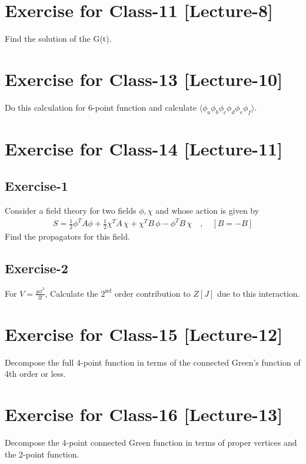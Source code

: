 \documentclass[14pt]{article} %
\begin{document}
\section{Exercise for Class-11 [Lecture-8]}
Find the solution of the G(t).
\section{Exercise for Class-13 [Lecture-10]} 
Do this calculation for 6-point function and calculate $\langle \phi_a \phi_b \phi_c \phi_d \phi_e \phi_f\rangle $.
\section{Exercise for Class-14 [Lecture-11]} 
\subsection{Exercise-1}
Consider a field theory for two fields $\phi, \chi$ and whose action is given by
\begin{align*}
S = \frac{1}{2} \phi^T A \phi + \frac{1}{2} \chi^T A\, \chi + \chi^T B \, \phi - \phi^T B\, \chi \quad, \quad [B = -B]
\end{align*}
Find the propagators for this field.
\subsection{Exercise-2}
For $V=\frac{{g \phi^3}}{3!}$, Calculate the $2^{\text{nd}}$ order contribution to $Z[J]$ due to this interaction.
\section{Exercise for Class-15 [Lecture-12]} 
Decompose the full 4-point function in terms of the connected Green's function of 4th order or less.
\section{Exercise for Class-16 [Lecture-13]} 
Decompose the 4-point connected Green function in terms of proper vertices and the 2-point function.
\end{document}

